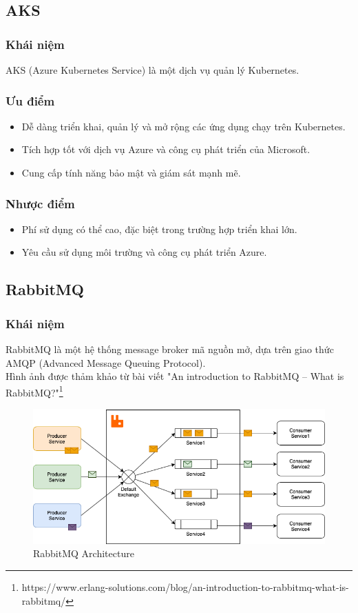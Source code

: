 \subsection{AKS}
\subsubsection{Khái niệm}
\noindent AKS (Azure Kubernetes Service) là một dịch vụ quản lý Kubernetes.

\subsubsection{Ưu điểm}
\begin{itemize}
    \item Dễ dàng triển khai, quản lý và mở rộng các ứng dụng chạy trên Kubernetes.
    \item Tích hợp tốt với dịch vụ Azure và công cụ phát triển của Microsoft.
    \item Cung cấp tính năng bảo mật và giám sát mạnh mẽ.
\end{itemize}
\subsubsection{Nhược điểm}
\begin{itemize}
    \item Phí sử dụng có thể cao, đặc biệt trong trường hợp triển khai lớn.
    \item Yêu cầu sử dụng môi trường và công cụ phát triển Azure.
\end{itemize}
\subsection{RabbitMQ}
\subsubsection{Khái niệm}
\noindent RabbitMQ là một hệ thống message broker mã nguồn mở, dựa trên giao thức AMQP (Advanced Message Queuing Protocol).\\[0.5cm]
Hình ảnh được thảm khảo từ bài viết "An introduction to RabbitMQ – What is RabbitMQ?"\footnote{https://www.erlang-solutions.com/blog/an-introduction-to-rabbitmq-what-is-rabbitmq/} 
\begin{figure}[H]

    \begin{center}
    \includegraphics[scale = 0.5]{images/phat/rabbitMQ.png}
    \vspace*{7mm}
    \caption{RabbitMQ Architecture}
    \end{center}
    \label{}
\end{figure}
